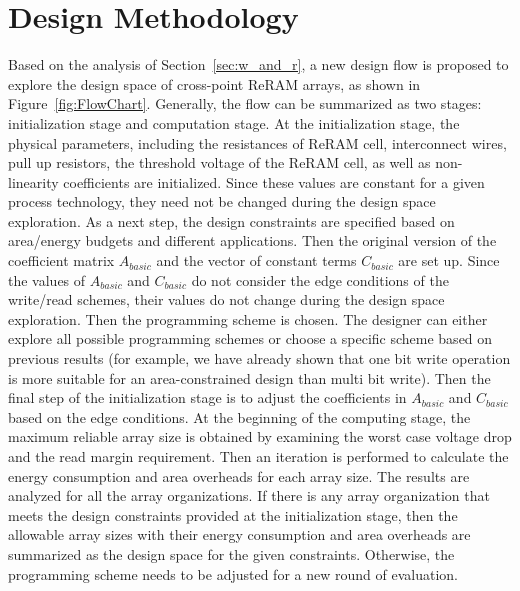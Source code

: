 \vspace{10pt}
\section{Design Methodology}\label{sec:framwork}
Based on the analysis of Section~\ref{sec:w_and_r}, a new design flow is proposed to explore the design space of cross-point ReRAM arrays, as shown in Figure~\ref{fig:FlowChart}. Generally, the flow can be summarized as two stages: initialization stage and computation stage. At the initialization stage, the physical parameters, including the resistances of ReRAM cell, interconnect wires, pull up resistors, the threshold voltage of the ReRAM cell, as well as non-linearity coefficients are initialized. Since these values are constant for a given process technology, they need not be changed during the design space exploration. As a next step, the design constraints are specified based on area/energy budgets and different applications. Then the  original version of the coefficient matrix $A_{basic}$ and the vector of constant terms $C_{basic}$ are set up. Since the values of $A_{basic}$ and $C_{basic}$ do not consider the edge conditions of the write/read schemes, their values do not change during the design space exploration. Then the programming scheme is chosen. The designer can either explore all possible programming schemes or choose a specific scheme based on previous results (for example, we have already shown that one bit write operation is more suitable for an area-constrained design than multi bit write). Then the final step of the initialization stage is to adjust the coefficients in $A_{basic}$ and $C_{basic}$ based on the edge conditions. At the beginning of the computing stage, the maximum reliable array size is obtained by examining the worst case voltage drop and the read margin requirement. Then an iteration is performed to calculate the energy consumption and area overheads for each array size. The results are analyzed for all the array organizations. If there is any array organization that meets the design constraints provided at  the initialization stage, then the allowable array sizes with their energy consumption and area overheads are summarized as the design space for the given constraints. Otherwise, the programming scheme needs to be adjusted for a new round of evaluation.



